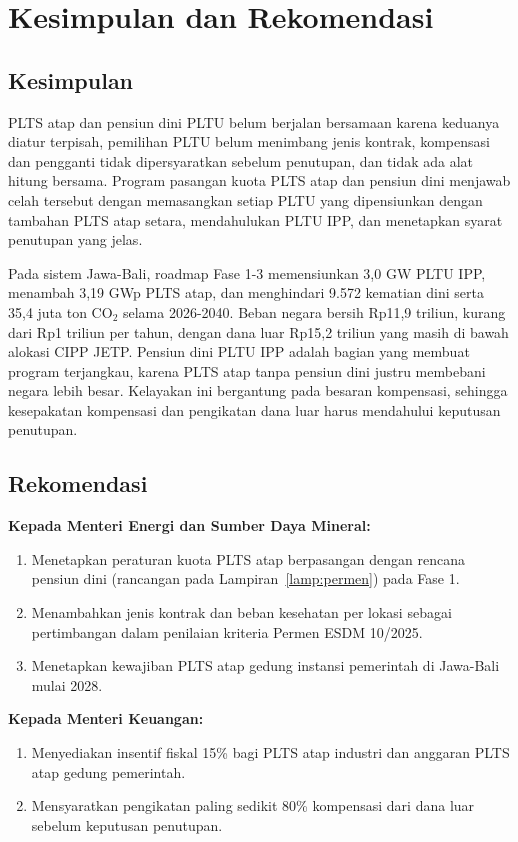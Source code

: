 \section{Kesimpulan dan Rekomendasi}
\label{sec:kesimpulan}

\subsection{Kesimpulan}

PLTS atap dan pensiun dini PLTU belum berjalan bersamaan karena keduanya diatur terpisah, pemilihan PLTU belum menimbang jenis kontrak, kompensasi dan pengganti tidak dipersyaratkan sebelum penutupan, dan tidak ada alat hitung bersama. Program pasangan kuota PLTS atap dan pensiun dini menjawab celah tersebut dengan memasangkan setiap PLTU yang dipensiunkan dengan tambahan PLTS atap setara, mendahulukan PLTU IPP, dan menetapkan syarat penutupan yang jelas.

Pada sistem Jawa-Bali, roadmap Fase 1-3 memensiunkan 3,0 GW PLTU IPP, menambah 3,19 GWp PLTS atap, dan menghindari 9.572 kematian dini serta 35,4 juta ton CO$_2$ selama 2026-2040. Beban negara bersih Rp11,9 triliun, kurang dari Rp1 triliun per tahun, dengan dana luar Rp15,2 triliun yang masih di bawah alokasi CIPP JETP. Pensiun dini PLTU IPP adalah bagian yang membuat program terjangkau, karena PLTS atap tanpa pensiun dini justru membebani negara lebih besar. Kelayakan ini bergantung pada besaran kompensasi, sehingga kesepakatan kompensasi dan pengikatan dana luar harus mendahului keputusan penutupan.

\subsection{Rekomendasi}

\textbf{Kepada Menteri Energi dan Sumber Daya Mineral:}
\begin{enumerate}
  \item Menetapkan peraturan kuota PLTS atap berpasangan dengan rencana pensiun dini (rancangan pada Lampiran~\ref{lamp:permen}) pada Fase 1.
  \item Menambahkan jenis kontrak dan beban kesehatan per lokasi sebagai pertimbangan dalam penilaian kriteria Permen ESDM 10/2025.
  \item Menetapkan kewajiban PLTS atap gedung instansi pemerintah di Jawa-Bali mulai 2028.
\end{enumerate}

\textbf{Kepada Menteri Keuangan:}
\begin{enumerate}[resume]
  \item Menyediakan insentif fiskal 15\% bagi PLTS atap industri dan anggaran PLTS atap gedung pemerintah.
  \item Mensyaratkan pengikatan paling sedikit 80\% kompensasi dari dana luar sebelum keputusan penutupan.
\end{enumerate}

